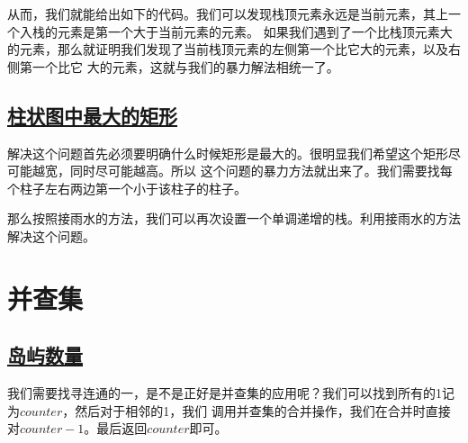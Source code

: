 \documentclass[../../main.tex]{subfiles}
\begin{document}
从而，我们就能给出如下的代码。我们可以发现栈顶元素永远是当前元素，其上一个入栈的元素是第一个大于当前元素的元素。
如果我们遇到了一个比栈顶元素大的元素，那么就证明我们发现了当前栈顶元素的左侧第一个比它大的元素，以及右侧第一个比它
大的元素，这就与我们的暴力解法相统一了。



\subsection{\href{https://leetcode-cn.com/problems/largest-rectangle-in-histogram/}{柱状图中最大的矩形}}

解决这个问题首先必须要明确什么时候矩形是最大的。很明显我们希望这个矩形尽可能越宽，同时尽可能越高。所以
这个问题的暴力方法就出来了。我们需要找每个柱子左右两边第一个小于该柱子的柱子。

那么按照接雨水的方法，我们可以再次设置一个单调递增的栈。利用接雨水的方法解决这个问题。



\section{并查集}

\subsection{\href{https://leetcode.cn/problems/number-of-islands/}{岛屿数量}}

我们需要找寻连通的一，是不是正好是并查集的应用呢？我们可以找到所有的1记为$counter$，然后对于相邻的1，我们
调用并查集的合并操作，我们在合并时直接对$counter - 1$。最后返回$counter$即可。


\end{document}
